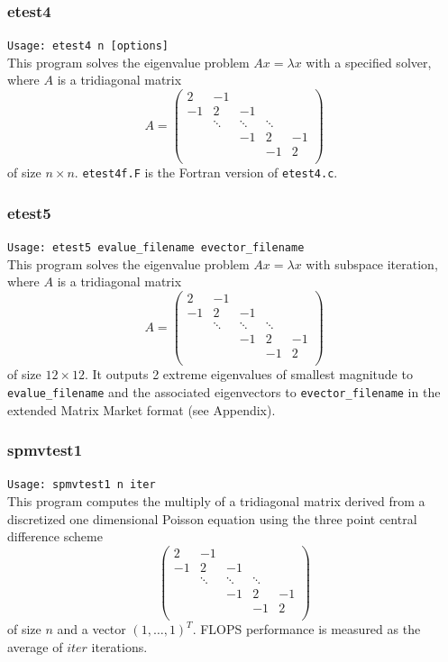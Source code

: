 \documentclass[a4paper]{article}
\begin{document}
\subsubsection{etest4}

\verb+Usage: etest4 n [options]+\\

This program solves the eigenvalue problem $Ax = \lambda x$ with a specified 
solver, where $A$ is a tridiagonal matrix
\[
A = 
\left(
\begin{array}{ccccc}
2 & -1 &   &  &   \\
-1 & 2 & -1 &  &   \\
  & \ddots  & \ddots  & \ddots  &   \\
  &   & -1 & 2 & -1 \\
  &   &   & -1 & 2 \\
\end{array}
\right)
\]
of size $n \times n$.
{\tt etest4f.F} is the Fortran version of {\tt etest4.c}.

\subsubsection{etest5}

\verb+Usage: etest5 evalue_filename evector_filename +\\

This program solves the eigenvalue problem $Ax = \lambda x$ with 
subspace iteration, where $A$ is a tridiagonal matrix
\[
A = 
\left(
\begin{array}{ccccc}
2 & -1 &   &  &   \\
-1 & 2 & -1 &  &   \\
  & \ddots  & \ddots  & \ddots  &   \\
  &   & -1 & 2 & -1 \\
  &   &   & -1 & 2 \\
\end{array}
\right)
\]
of size $12 \times 12$.
It outputs 2 extreme eigenvalues of smallest magnitude to 
{\tt evalue\_filename} and the associated eigenvectors to 
{\tt evector\_filename} in the extended Matrix Market format (see Appendix). 

\subsubsection{spmvtest1}

\verb+Usage: spmvtest1 n iter+\\

This program computes the multiply of a tridiagonal matrix
derived from a discretized one dimensional Poisson equation 
using the three point central difference scheme 
\[
\left(
\begin{array}{ccccc}
2 & -1 &   &  &   \\
-1 & 2 & -1 &  &   \\
  & \ddots  & \ddots  & \ddots  &   \\
  &   & -1 & 2 & -1 \\
  &   &   & -1 & 2 \\
\end{array}
\right)
\]
of size $n$ and a vector $(1,\dots,1)^T$. 
FLOPS performance is measured as the average of $iter$ iterations. 
\end{document}
